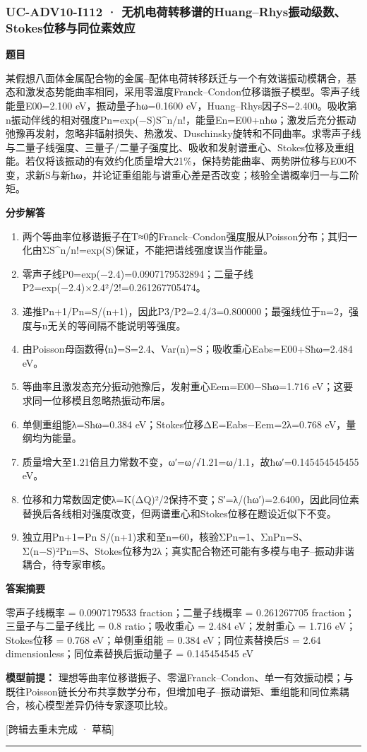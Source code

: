 \documentclass[UTF8,11pt,a4paper]{ctexart}
\begin{document}
\subsubsection*{UC-ADV10-I112 · 无机电荷转移谱的Huang–Rhys振动级数、Stokes位移与同位素效应}
\noindent\textbf{题目}\par
某假想八面体金属配合物的金属–配体电荷转移跃迁与一个有效谐振动模耦合，基态和激发态势能曲率相同，采用零温度Franck–Condon位移谐振子模型。零声子线能量E00=2.100 eV，振动量子ħω=0.1600 eV，Huang–Rhys因子S=2.400。吸收第n振动伴线的相对强度Pn=exp(−S)S\textasciicircum{}n/n!，能量En=E00+nħω；激发后充分振动弛豫再发射，忽略非辐射损失、热激发、Duschinsky旋转和不同曲率。求零声子线与二量子线强度、三量子/二量子强度比、吸收和发射谱重心、Stokes位移及重组能。若仅将该振动的有效约化质量增大21\%，保持势能曲率、两势阱位移与E00不变，求新S与新ħω，并论证重组能与谱重心差是否改变；核验全谱概率归一与二阶矩。\par
\medskip\noindent\textbf{分步解答}
\begin{enumerate}
\item 两个等曲率位移谐振子在T≈0的Franck–Condon强度服从Poisson分布；其归一化由ΣS\textasciicircum{}n/n!=exp(S)保证，不能把谱线强度误当作能量。
\item 零声子线P0=exp(−2.4)=0.0907179532894；二量子线P2=exp(−2.4)×2.4²/2!=0.261267705474。
\item 递推Pn+1/Pn=S/(n+1)，因此P3/P2=2.4/3=0.800000；最强线位于n=2，强度与n无关的等间隔不能说明等强度。
\item 由Poisson母函数得⟨n⟩=S=2.4、Var(n)=S；吸收重心Eabs=E00+Sħω=2.484 eV。
\item 等曲率且激发态充分振动弛豫后，发射重心Eem=E00−Sħω=1.716 eV；这要求同一位移模且忽略热振动布居。
\item 单侧重组能λ=Sħω=0.384 eV；Stokes位移ΔE=Eabs−Eem=2λ=0.768 eV，量纲均为能量。
\item 质量增大至1.21倍且力常数不变，ω′=ω/√1.21=ω/1.1，故ħω′=0.145454545455 eV。
\item 位移和力常数固定使λ=K(ΔQ)²/2保持不变；S′=λ/(ħω′)=2.6400，因此同位素替换后各线相对强度改变，但两谱重心和Stokes位移在题设近似下不变。
\item 独立用Pn+1=Pn S/(n+1)求和至n=60，核验ΣPn=1、ΣnPn=S、Σ(n−S)²Pn=S、Stokes位移为2λ；真实配合物还可能有多模与电子–振动非谐耦合，待专家审核。
\end{enumerate}
\noindent\textbf{答案摘要}\par
零声子线概率 = 0.0907179533 fraction；二量子线概率 = 0.261267705 fraction；三量子与二量子线比 = 0.8 ratio；吸收重心 = 2.484 eV；发射重心 = 1.716 eV；Stokes位移 = 0.768 eV；单侧重组能 = 0.384 eV；同位素替换后S = 2.64 dimensionless；同位素替换后振动量子 = 0.145454545 eV\par
\noindent\textbf{模型前提：}
理想等曲率位移谐振子、零温Franck–Condon、单一有效振动模；与既往Poisson链长分布共享数学分布，但增加电子–振动谱矩、重组能和同位素耦合，核心模型差异仍待专家逐项比较。\par
\noindent\textcolor{red!65!black}{[跨辑去重未完成 · 草稿]} \par
\medskip\hrule\medskip
{}
\end{document}
